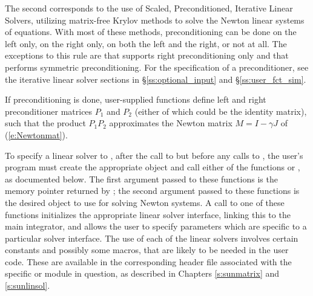 The second corresponds to the use of Scaled, Preconditioned, Iterative
Linear Solvers, utilizing matrix-free Krylov methods to solve the
Newton linear systems of equations.  With most of these methods,
preconditioning can be done on the left only, on the right only, on
both the left and the right, or not at all.  The exceptions to this
rule are {\spfgmr} that supports right preconditioning only and
{\pcg} that performs symmetric preconditioning.  For the specification
of a preconditioner, see the iterative linear solver sections 
in \S\ref{ss:optional_input} and \S\ref{ss:user_fct_sim}.

If preconditioning is done, user-supplied functions define left and right 
preconditioner matrices $P_1$ and $P_2$ (either of which could be the identity
matrix), such that the product $P_1 P_2$ approximates the Newton matrix
$M = I - \gamma J$ of (\ref{e:Newtonmat}).

To specify a linear solver to {\cvode}, after the call to 
but before any calls to , the user's program must create the
appropriate {\sunlinsol} object and call either of the functions
 or , as documented below. 
The first argument passed to these functions is the {\cvode}
memory pointer returned by ; the second argument
passed to these functions is the desired {\sunlinsol} object to use
for solving Newton systems.  A call to one of these functions
initializes the appropriate {\cvode} linear solver interface, linking
this to the main {\cvode} integrator, and allows the user to specify
parameters which are specific to a particular solver interface.
The use of each of the linear solvers involves certain constants and
possibly some macros, that are likely to be needed in the user code.
These are available in the corresponding header file associated with
the specific {\sunmatrix} or {\sunlinsol} module in question, as
described in Chapters \ref{s:sunmatrix} and \ref{s:sunlinsol}. 

